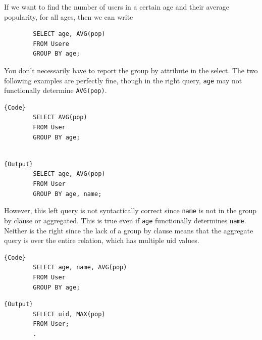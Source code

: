 \documentclass{article}
\begin{document}
    \begin{example}
      If we want to find the number of users in a certain age and their average popularity, for all ages, then we can write 
      \begin{lstlisting}
        SELECT age, AVG(pop) 
        FROM Usere
        GROUP BY age; 
      \end{lstlisting}
      You don't necessarily have to report the group by attribute in the select. The two following examples are perfectly fine, though in the right query, \texttt{age} may not functionally determine \texttt{AVG(pop)}. 

      \noindent\begin{minipage}{.5\textwidth}
      \begin{lstlisting}[]{Code}
        SELECT AVG(pop) 
        FROM User
        GROUP BY age; 
        
      \end{lstlisting}
      \end{minipage}
      \hfill
      \begin{minipage}{.49\textwidth}
      \begin{lstlisting}[]{Output}
        SELECT age, AVG(pop)  
        FROM User 
        GROUP BY age, name; 
      \end{lstlisting}
      \end{minipage}

      However, this left query is not syntactically correct since \texttt{name} is not in the group by clause or aggregated. This is true even if \texttt{age} functionally determines \texttt{name}. Neither is the right since the lack of a group by clause means that the aggregate query is over the entire relation, which has multiple uid values. 

      \noindent\begin{minipage}{.5\textwidth}
      \begin{lstlisting}[]{Code}
        SELECT age, name, AVG(pop) 
        FROM User
        GROUP BY age; 
      \end{lstlisting}
      \end{minipage}
      \hfill
      \begin{minipage}{.49\textwidth}
      \begin{lstlisting}[]{Output}
        SELECT uid, MAX(pop) 
        FROM User; 
        .
      \end{lstlisting}
      \end{minipage}
    \end{example}
\end{document}
